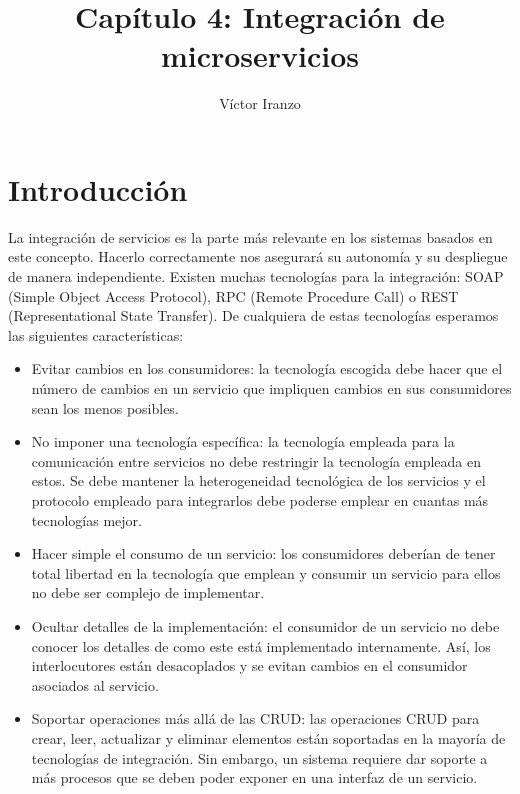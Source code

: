 \documentclass[11pt,a4paper]{article}
\author{Víctor Iranzo}
\title{Capítulo 4: Integración de microservicios}
\begin{document}
\maketitle

\part{Introducción}

La integración de servicios es la parte más relevante en los sistemas basados en este concepto. Hacerlo correctamente nos asegurará su autonomía y su despliegue de manera independiente. Existen muchas tecnologías para la integración: SOAP (Simple Object Access Protocol), RPC (Remote Procedure Call) o REST (Representational State Transfer). De cualquiera de estas tecnologías esperamos las siguientes características:

\begin{itemize}

\item Evitar cambios en los consumidores: la tecnología escogida debe hacer que el número de cambios en un servicio que impliquen cambios en sus consumidores sean los menos posibles.

\item No imponer una tecnología específica: la tecnología empleada para la comunicación entre servicios no debe restringir la tecnología empleada en estos. Se debe mantener la heterogeneidad tecnológica de los servicios y el protocolo empleado para integrarlos debe poderse emplear en cuantas más tecnologías mejor.

\item Hacer simple el consumo de un servicio: los consumidores deberían de tener total libertad en la tecnología que emplean y consumir un servicio para ellos no debe ser complejo de implementar.

\item Ocultar detalles de la implementación: el consumidor de un servicio no debe conocer los detalles de como este está implementado internamente. Así, los interlocutores están desacoplados y se evitan cambios en el consumidor asociados al servicio.

\item Soportar operaciones más allá de las CRUD: las operaciones CRUD para crear, leer, actualizar y eliminar elementos están soportadas en la mayoría de tecnologías de integración. Sin embargo, un sistema requiere dar soporte a más procesos que se deben poder exponer en una interfaz de un servicio.

\end{itemize}
\end{document}
